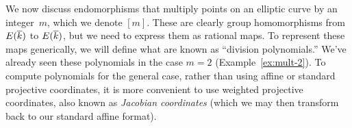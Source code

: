 %

We now discuss endomorphisms that multiply points on an elliptic curve by an integer~$m$, which we denote $[m]$.
These are clearly group homomorphisms from $E(\overline{k})$ to $E(\overline{k})$, but we need to express them as rational maps.
To represent these maps generically, we will define what are known as ``division polynomials.''  We've already seen these polynomials in the case $m=2$ (Example~\ref{ex:mult-2}).  To compute polynomials for the general case, rather than using affine or standard projective coordinates, it is more convenient to use weighted projective coordinates, also known as \emph{Jacobian coordinates} (which we may then transform back to our standard affine format).

